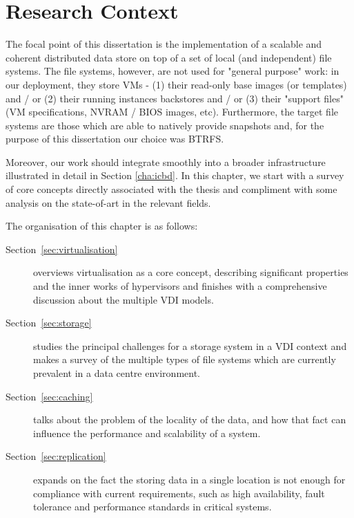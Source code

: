 
\chapter{Research Context}
\label{cha:research_context}

The focal point of this dissertation is the implementation of a scalable and coherent distributed data store on top of a set of local (and independent) file systems. The file systems, however, are not used for "general purpose" work: in our deployment, they store VMs - (1) their read-only base images (or templates) and / or (2) their running instances backstores and / or (3) their "support files" (VM specifications, NVRAM / BIOS images, etc).
Furthermore, the target file systems are those which are able to natively provide snapshots and, for the purpose of this dissertation our choice was BTRFS.


 
 Moreover, our work should integrate smoothly into a broader infrastructure illustrated in detail in Section \ref{cha:icbd}.
In this chapter, we start with a survey of core concepts directly associated with the thesis and compliment with some analysis on the state-of-art in the relevant fields.

The organisation of this chapter is as follows:

\begin{description}
	\item [Section~\ref{sec:virtualisation}] overviews virtualisation as a core concept, describing significant properties and the inner works of hypervisors and finishes with a comprehensive discussion about the multiple VDI models.
	\item [Section~\ref{sec:storage}] studies the principal challenges for a storage system in a VDI context and makes a survey of the multiple types of file systems which are currently prevalent in a data centre environment. 
	\item [Section~\ref{sec:caching}] talks about the problem of the locality of the data, and how that fact can influence the performance and scalability of a system.
	\item [Section~\ref{sec:replication}] expands on the fact the storing data in a single location is not enough for compliance with current requirements, such as high availability, fault tolerance and performance standards in critical systems.
\end{description}

